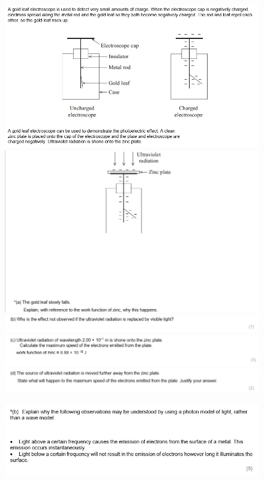 \documentclass[12pt]{article}
\begin{document}
    \begin{figure}[h]
        \includegraphics[width = \linewidth]{Question3P1.jpg}
        \includegraphics[width = \linewidth]{Question3P2.jpg}
        \includegraphics[width = \linewidth]{Question3P3.jpg}
        \includegraphics[width = \linewidth]{Question3P4.jpg}
        \includegraphics[width = \linewidth]{Question3P5.jpg}
    \end{figure}
    \begin{figure}[h]
        \includegraphics[width = \linewidth]{Question6.jpg}
    \end{figure}
\end{document}
